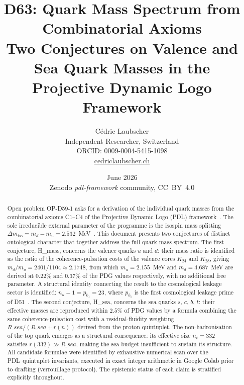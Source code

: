 \documentclass[12pt,a4paper]{article}
\def\PDL{PDL}
\def\Rsea{R\_sea}
\theoremstyle{plain}
\theoremstyle{definition}
\theoremstyle{remark}
\newcommand{\PDL}{\textnormal{PDL}}
\newcommand{\nnu}{n_u}
\newcommand{\Rsea}{R_{\mathrm{sea}}}
\newcommand{\Dmiso}{\Delta m_{\mathrm{iso}}}
\newcommand{\mup}{m_u}
\newcommand{\mdown}{m_d}
\begin{document}

\title{\texorpdfstring{D63: Quark Mass Spectrum from Combinatorial Axioms\\[4pt] \large Two Conjectures on Valence and Sea Quark Masses in the Projective Dynamic Logo Framework}{D63: Quark Mass Spectrum from Combinatorial Axioms}}

\author{C\'edric Laubscher\\[4pt] \small Independent Researcher, Switzerland\\ \small ORCID: 0009-0004-5415-1098\\ \small \href{https://cedriclaubscher.ch}{cedriclaubscher.ch}}

\date{June 2026\\[2pt] \small Zenodo \textit{pdl-framework} community, CC~BY~4.0}

\maketitle

\begin{abstract}
Open problem OP-D59-1 asks for a derivation of the individual quark masses from the combinatorial axioms C1--C4 of the Projective Dynamic Logo (\PDL) framework~\cite{D01,D43}. The sole irreducible external parameter of the programme is the isospin mass splitting $\Dmiso = \mdown - \mup = 2.532$~MeV~\cite{D31}. This document presents two conjectures of distinct ontological character that together address the full quark mass spectrum. The first conjecture, H\_mass, concerns the valence quarks $u$ and $d$: their mass ratio is identified as the ratio of the coherence-pulsation costs of the valence cores $K_{24}$ and $K_{28}$, giving $\mdown/\mup = 2401/1104 \approx 2.1748$, from which $\mup = 2.155$~MeV and $\mdown = 4.687$~MeV are derived at $0.22\%$ and $0.37\%$ of the PDG values respectively, with no additional free parameter. A structural identity connecting the result to the cosmological leakage sector is identified: $\nnu - 1 = p_{k_1} = 23$, where $p_{k_1}$ is the first cosmological leakage prime of D51~\cite{D51}. The second conjecture, H\_sea, concerns the sea quarks $s$, $c$, $b$, $t$: their effective masses are reproduced within $2.5\%$ of PDG values by a formula combining the same coherence-pulsation cost with a residual-fluidity weighting $\Rsea/(\Rsea + r(n))$ derived from the proton quintuplet. The non-hadronisation of the top quark emerges as a structural consequence: its effective size $n_t = 332$ satisfies $r(332) \gg \Rsea$, making the sea budget insufficient to sustain its structure. All candidate formulae were identified by exhaustive numerical scan over the \PDL\ quintuplet invariants, executed in exact integer arithmetic in Google Colab prior to drafting (verrouillage protocol). The epistemic status of each claim is stratified explicitly throughout.
\end{abstract}
\end{document}
